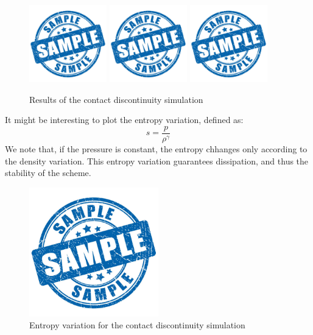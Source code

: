 \documentclass{report}
\begin{document}
\begin{figure}[H]
    \centering
    \includegraphics[width=0.3\textwidth]{Images/sample.jpg}
    \includegraphics[width=0.3\textwidth]{Images/sample.jpg}
    \includegraphics[width=0.3\textwidth]{Images/sample.jpg}
    \caption{Results of the contact discontinuity simulation}
    \label{fig:contact_discontinuity_results}
\end{figure}
It might be interesting to plot the entropy variation, defined as:
\begin{equation*}
    s = \frac{p}{\rho^\gamma}
\end{equation*}
We note that, if the pressure is constant, the entropy chhanges only according to the density variation. This entropy variation guarantees dissipation, and thus the 
stability of the scheme.
\begin{figure}[H]
    \centering
    \includegraphics[width=0.5\textwidth]{Images/sample.jpg}

    \caption{Entropy variation for the contact discontinuity simulation}
    \label{fig:contact_discontinuity_entropy}
\end{figure}
\end{document}
